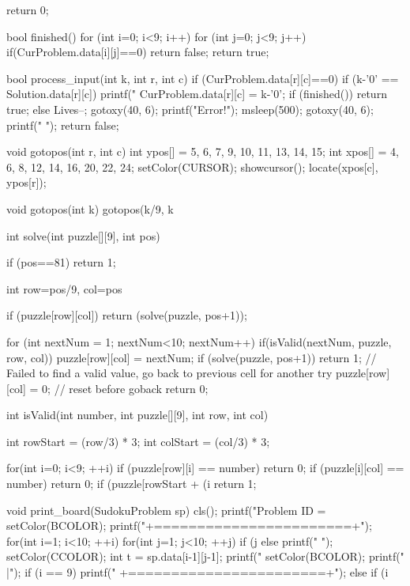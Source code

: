 \documentclass[12pt,a4paper]{article}
\begin{document}
\begin{cppcode}
{	return 0;
}

bool finished()
{
	for (int i=0; i<9; i++) {
		for (int j=0; j<9; j++) {
			if(CurProblem.data[i][j]==0) return false;
		}
	}
	return true;
}

bool process_input(int k, int r, int c)
{
	if (CurProblem.data[r][c]==0) {
		if (k-'0' == Solution.data[r][c]) {
			printf("%
			CurProblem.data[r][c] = k-'0';
			if (finished()) return true;
		} else {
			Lives--;
			gotoxy(40, 6);
			printf("Error!");
			msleep(500);
			gotoxy(40, 6);
			printf("          ");
		}
	}
	return false;
}

void gotopos(int r, int c)
{
	int ypos[] = {5, 6, 7, 9, 10, 11, 13, 14, 15};
	int xpos[] = {4, 6, 8, 12, 14, 16, 20, 22, 24};
	setColor(CURSOR);
	showcursor();
	locate(xpos[c], ypos[r]);
}

void gotopos(int k)
{
	gotopos(k/9, k%
}

int solve(int puzzle[][9], int pos)
{
	if (pos==81) return 1;
	
	int row=pos/9, col=pos%
	
	if (puzzle[row][col]) return (solve(puzzle, pos+1));
	
	for (int nextNum = 1; nextNum<10; nextNum++) {
		if(isValid(nextNum, puzzle, row, col)) {
			puzzle[row][col] = nextNum;
			if (solve(puzzle, pos+1)) return 1;
		}
	}
	// Failed to find a valid value, go back to previous cell for another try
	puzzle[row][col] = 0; // reset before goback
	return 0;
}

int isValid(int number, int puzzle[][9], int row, int col)
{
	int rowStart = (row/3) * 3;
	int colStart = (col/3) * 3;
	
	for(int i=0; i<9; ++i)
	{
		if (puzzle[row][i] == number) return 0;
		if (puzzle[i][col] == number) return 0;
		if (puzzle[rowStart + (i%
	}
	return 1;
}

void print_board(SudokuProblem sp)
{
	cls();
	printf("\n     Problem ID = %
	setColor(BCOLOR);
	printf("\n +=======================+\n");
	for(int i=1; i<10; ++i) {
		for(int j=1; j<10; ++j) {
			if (j%
			else printf(" ");
			setColor(CCOLOR);
			int t = sp.data[i-1][j-1];
			printf("%
			setColor(BCOLOR);
		}
		printf(" |\n");
		if (i == 9) printf(" +=======================+\n");
		else if (i%
	}
}
\end{cppcode}
\end{document}
